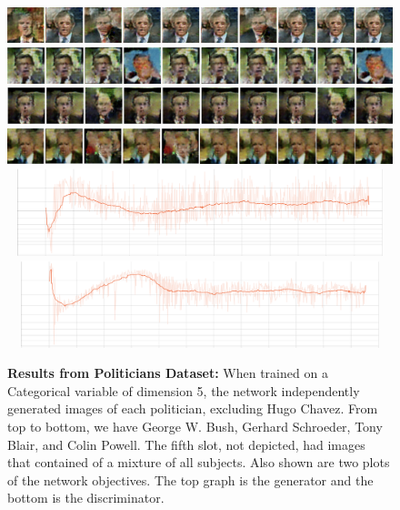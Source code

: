\documentclass[conference,11pt]{IEEEtran}
\begin{document}
\begin{figure}
    \centering
    \includegraphics[width=7.25in]{pictures/politicians/bush-final.jpg}\vspace*{2mm}
    \hspace*{.15mm}\includegraphics[width=7.25in]{pictures/politicians/schroeder-final.jpg}\vspace{2mm}
    \hspace*{.15mm}\includegraphics[width=7.25in]{pictures/politicians/blair-final.jpg}\vspace{2mm}
    \hspace*{.15mm}\includegraphics[width=7.25in]{pictures/politicians/powell-final.jpg}\vspace*{2mm}
    \hspace*{.15mm}\includegraphics[width=7.25in,height=1in]{pictures/politicians/generatorOBJ.png}\vspace*{2mm}
    \hspace*{.15mm}\includegraphics[width=7.25in,height=1in]{pictures/politicians/discriminatorOBJ.png}
    \caption{\textbf{Results from Politicians Dataset:} When trained on a Categorical variable of dimension 5, the network independently generated images of each politician, excluding Hugo Chavez.  From top to bottom, we have George W. Bush, Gerhard Schroeder, Tony Blair, and Colin Powell.  The fifth slot, not depicted, had images that contained of a mixture of all subjects.  Also shown are two plots of the network objectives.  The top graph is the generator and the bottom is the discriminator.}
\end{figure}
\end{document}
